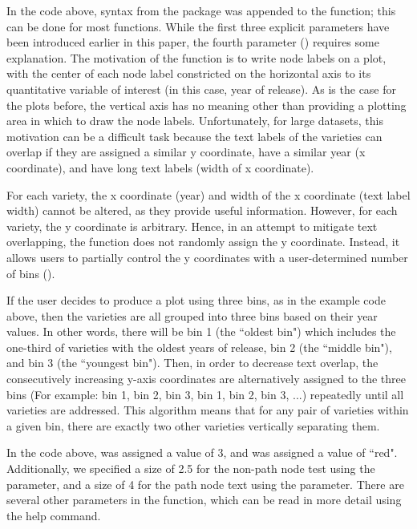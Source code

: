 \documentclass[article,shortnames]{jss}
\begin{document}
In the code above, syntax from the  package was appended to the  function; this can be done for most  functions. While the first three explicit parameters have been introduced earlier in this paper, the fourth parameter () requires some explanation. The motivation of the  function is to write node labels on a plot, with the center of each node label constricted on the horizontal axis to its quantitative variable of interest (in this case, year of release). As is the case for the plots before, the vertical axis has no meaning other than providing a plotting area in which to draw the node labels. Unfortunately, for large datasets, this motivation can be a difficult task because the text labels of the varieties can overlap if they are assigned a similar y coordinate, have a similar year (x coordinate), and have long text labels (width of x coordinate).

For each variety, the x coordinate (year) and width of the x coordinate (text label width) cannot be altered, as they provide useful information. However, for each variety, the y coordinate is arbitrary. Hence, in an attempt to mitigate text overlapping, the  function does not randomly assign the y coordinate. Instead, it allows users to partially control the y coordinates with a user-determined number of bins ().

If the user decides to produce a plot using three bins, as in the example code above, then the varieties are all grouped into three bins based on their year values. In other words, there will be bin 1 (the ``oldest bin") which includes the one-third of varieties with the oldest years of release, bin 2 (the ``middle bin"), and bin 3 (the ``youngest bin"). Then, in order to decrease text overlap, the consecutively increasing y-axis coordinates are alternatively assigned to the three bins (For example: bin 1, bin 2, bin 3, bin 1, bin 2, bin 3, ...) repeatedly until all varieties are addressed. This algorithm means that for any pair of varieties within a given bin, there are exactly two other varieties vertically separating them.

In the code above,  was assigned a value of 3, and  was assigned a value of ``red". Additionally, we specified a size of 2.5 for the non-path node test using the  parameter, and a size of 4 for the path node text using the  parameter. There are several other parameters in the  function, which can be read in more detail using the help command.
\end{document}

